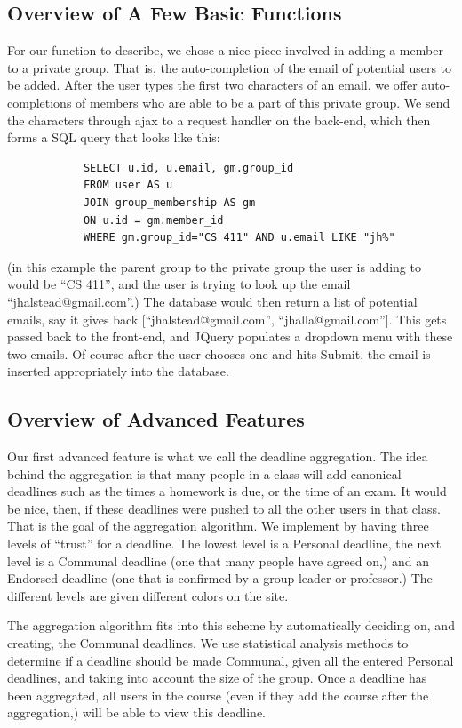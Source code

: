 \documentclass{article}
\begin{document}
		\subsection[Basic Functions]{Overview of A Few Basic Functions}
		For our function to describe, we chose a nice piece involved in adding
		a member to a private group. That is, the auto-completion of the email
		of potential users to be added. After the user types the first two
		characters of an email, we offer auto-completions of members who
		are able to be a part of this private group. We send the characters
		through ajax to a request handler on the back-end, which then forms
		a SQL query that looks like this:

			\begin{verbatim}
			SELECT u.id, u.email, gm.group_id
			FROM user AS u
			JOIN group_membership AS gm
			ON u.id = gm.member_id
			WHERE gm.group_id="CS 411" AND u.email LIKE "jh%"
			\end{verbatim}

		(in this example the parent group to the private group the user is 
		adding to would be ``CS 411'', and the user is trying to look up the
		email ``jhalstead@gmail.com''.) The database would then return a list of
		potential emails, say it gives back [``jhalstead@gmail.com'',
		``jhalla@gmail.com'']. This gets passed back to the front-end, and JQuery
		populates a dropdown menu with these two emails. Of course after the
		user chooses one and hits Submit, the email is inserted appropriately
		into the database.


		\subsection[Advanced Functions]{Overview of Advanced Features}
		Our first advanced feature is what we call the deadline aggregation. The idea
		behind the aggregation is that many people in a class will add canonical deadlines
		such as the times a homework is due, or the time of an exam. It would be nice,
		then, if these deadlines were pushed to all the other users in that class.
		That is the goal of the aggregation algorithm. We implement by having
		three levels of ``trust'' for a deadline. The lowest level is a Personal
		deadline, the next level is a Communal deadline (one that many people have 
		agreed on,) and an Endorsed deadline (one that is confirmed by a group leader
		or professor.) The different levels are given different colors on the site.

		The aggregation algorithm fits into this scheme by automatically deciding
		on, and creating, the Communal deadlines. We use statistical analysis methods
		to determine if a deadline should be made Communal, given all the entered
		Personal deadlines, and taking into account the size of the group. Once a deadline
		has been aggregated, all users in the course (even if they add the course after
		the aggregation,) will be able to view this deadline.
\end{document}
